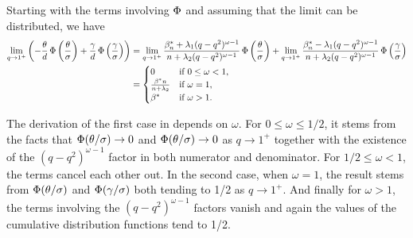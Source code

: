 Starting with the terms involving \(\operatorname{\Phi}\) and assuming that the limit can be distributed,
we have
\begin{align}
  \lim_{q \rightarrow 1^+} \left(-\frac{\theta}{d} \operatorname{\Phi}\left(\frac{\theta}{\sigma}\right) + \frac{\gamma}{d} \operatorname{\Phi} \left(\frac{\gamma}{\sigma}\right)\right)
   & = \lim_{q\rightarrow 1^+} \frac{\beta^*_n + \lambda_1(q-q^2)^{\omega -1}}{n + \lambda_2(q-q^2)^{\omega - 1}}\operatorname{\Phi}\left(\frac{\theta}{\sigma}\right) + \lim_{q\rightarrow 1^+} \frac{\beta^*_n - \lambda_1(q-q^2)^{\omega -1}}{n + \lambda_2(q-q^2)^{\omega - 1}}\operatorname{\Phi}\left(\frac{\gamma}{\sigma}\right) \nonumber \\
   & =\begin{cases}
        0                              & \text{if } 0 \leq \omega < 1, \\
        \frac{\beta^*n}{n + \lambda_2} & \text{if } \omega = 1,        \\
        \beta^*                        & \text{if } \omega > 1.
      \end{cases} \label{eq:eval-qlimit-terms-weighted}
\end{align}

The derivation of the first case in  depends on
\(\omega\). For \(0 \leq \omega \leq 1/2\), it stems from the facts that
\(\operatorname{\Phi}(\theta/\sigma) \rightarrow 0\) and \(\operatorname{\Phi}(\theta/\sigma) \rightarrow 0\) as \(q
\rightarrow 1^+\) together with the existence of the \((q-q^2)^{\omega - 1}\) factor in
both numerator and denominator. For \(1/2 \leq \omega < 1\), the terms cancel each other
out. In the second case, when \(\omega = 1\), the result stems from \(\operatorname{\Phi}(\theta/\sigma)\)
and \(\operatorname{\Phi}(\gamma/\sigma)\) both tending to 1/2 as \(q \rightarrow 1^+\). And finally for
\(\omega > 1\), the terms involving the \((q-q^2)^{\omega - 1}\) factors vanish and again
the values of the cumulative distribution functions tend to 1/2.

